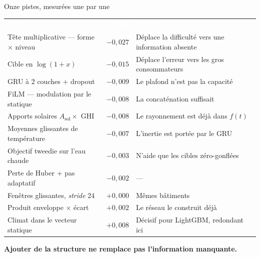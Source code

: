 \begin{frame}{Onze pistes, mesurées une par une}
\vspace{0.2em}
\centering\footnotesize
\renewcommand{\arraystretch}{1.12}
\begin{tabular}{@{}p{5.9cm} r p{4.6cm}@{}}
\rowcolor{BleuFonce}
\textcolor{white}{\textbf{Piste}} & \textcolor{white}{\textbf{Effet}} &
\textcolor{white}{\textbf{Lecture}} \\
\rowcolor{GrisLeger} Tête multiplicative --- forme $\times$ niveau & $-0{,}027$ &
Déplace la difficulté vers une information absente \\
Cible en $\log(1+x)$ & $-0{,}015$ & Déplace l'erreur vers les gros consommateurs \\
\rowcolor{GrisLeger} GRU à 2 couches + dropout & $-0{,}009$ & Le plafond n'est pas
la capacité \\
FiLM --- modulation par le statique & $-0{,}008$ & La concaténation suffisait \\
\rowcolor{GrisLeger} Apports solaires $A_{\text{sol}} \times$ GHI & $-0{,}008$ &
Le rayonnement est déjà dans $f(t)$ \\
Moyennes glissantes de température & $-0{,}007$ & L'inertie est portée par le GRU \\
\rowcolor{GrisLeger} Objectif tweedie sur l'eau chaude & $-0{,}003$ & N'aide que
les cibles zéro-gonflées \\
Perte de Huber + pas adaptatif & $-0{,}002$ & --- \\
\rowcolor{GrisLeger} Fenêtres glissantes, \textit{stride} 24 & $+0{,}000$ &
Mêmes bâtiments \\
Produit enveloppe $\times$ écart & $+0{,}002$ & Le réseau le construit déjà \\
\rowcolor{VertOK} Climat dans le vecteur statique & $+0{,}008$ & Décisif pour
LightGBM, redondant ici \\
\end{tabular}

\vspace{0.5em}
{\small \textbf{Ajouter de la structure ne remplace pas l'information manquante.}}
\end{frame}

